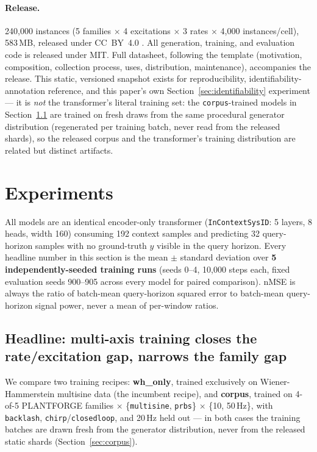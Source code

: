 \documentclass{article}
\begin{document}
\paragraph{Release.} 240{,}000 instances (5 families $\times$ 4 excitations
$\times$ 3 rates $\times$ 4{,}000 instances/cell), 583\,MB, released under
CC~BY~4.0 \citep{plantforgedataset}. All generation, training, and evaluation
code is released under MIT. Full datasheet, following the
\citet{gebru2021datasheets} template (motivation, composition,
collection process, uses, distribution, maintenance), accompanies the release.
This static, versioned snapshot exists for reproducibility, identifiability-annotation
reference, and this paper's own Section~\ref{sec:identifiability} experiment ---
it is \emph{not} the transformer's literal training set: the \texttt{corpus}-trained
models in Section~\ref{sec:headline} are trained on fresh draws from the same
procedural generator distribution (regenerated per training batch, never read from
the released shards), so the released corpus and the transformer's training
distribution are related but distinct artifacts.

\section{Experiments}
\label{sec:experiments}

All models are an identical encoder-only transformer (\texttt{InContextSysID}:
5 layers, 8 heads, width 160) consuming 192 context samples and predicting 32
query-horizon samples with no ground-truth $y$ visible in the query horizon.
Every headline number in this section is the mean $\pm$ standard deviation over
\textbf{5 independently-seeded training runs} (seeds 0--4, 10{,}000 steps each,
fixed evaluation seeds 900--905 across every model for paired comparison).
nMSE is always the ratio of batch-mean query-horizon squared error to batch-mean
query-horizon signal power, never a mean of per-window ratios.

\subsection{Headline: multi-axis training closes the rate/excitation gap, narrows the family gap}
\label{sec:headline}

We compare two training recipes: \textbf{wh\_only}, trained exclusively on
Wiener-Hammerstein multisine data (the incumbent recipe), and
\textbf{corpus}, trained on 4-of-5 PLANTFORGE families $\times$
\{\texttt{multisine}, \texttt{prbs}\} $\times$ \{10, 50\,Hz\}, with
\texttt{backlash}, \texttt{chirp}/\texttt{closedloop}, and 20\,Hz held out ---
in both cases the training batches are drawn fresh from the generator
distribution, never from the released static shards (Section~\ref{sec:corpus}).
\end{document}
